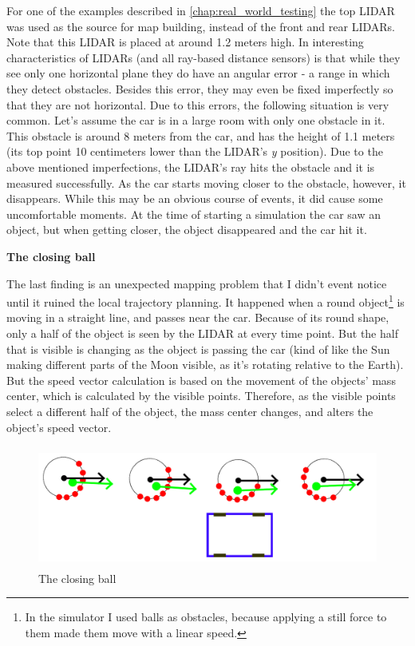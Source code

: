 For one of the examples described in \ref{chap:real_world_testing} the top LIDAR was used as the source for map building, instead of the front and rear LIDARs. Note that this LIDAR is placed at around 1.2 meters high. In interesting characteristics of LIDARs (and all ray-based distance sensors) is that while they see only one horizontal plane they do have an angular error - a range in which they detect obstacles. Besides this error, they may even be fixed imperfectly so that they are not horizontal. Due to this errors, the following situation is very common. Let's assume the car is in a large room with only one obstacle in it. This obstacle is around 8 meters from the car, and has the height of 1.1 meters (its top point 10 centimeters lower than the LIDAR's \textit{y} position). Due to the above mentioned imperfections, the LIDAR's ray hits the obstacle and it is measured successfully. As the car starts moving closer to the obstacle, however, it disappears. While this may be an obvious course of events, it did cause some uncomfortable moments. At the time of starting a simulation the car saw an object, but when getting closer, the object disappeared and the car hit it.

\textbf{The closing ball}

The last finding is an unexpected mapping problem that I didn't event notice until it ruined the local trajectory planning. It happened when a round object\footnote{In the simulator I used balls as obstacles, because applying a still force to them made them move with a linear speed.} is moving in a straight line, and passes near the car. Because of its round shape, only a half of the object is seen by the LIDAR at every time point. But the half that is visible is changing as the object is passing the car (kind of like the Sun making different parts of the Moon visible, as it's rotating relative to the Earth). But the speed vector calculation is based on the movement of the objects' mass center, which is calculated by the visible points. Therefore, as the visible points select a different half of the object, the mass center changes, and alters the object's speed vector.

\begin{figure}[!ht]
	\centering
	\includegraphics[height=40mm]{figures/raw/closing_ball.png}
	\caption{The closing ball}
	\label{closing_ball}
\end{figure} 

